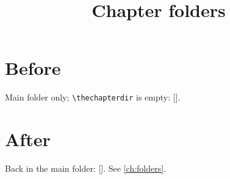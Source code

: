 \documentclass{akizumi-book}
\title{Chapter folders}
\begin{document}
\mainmatter
\chapter{Before}
Main folder only; \verb|\thechapterdir| is empty: [\thechapterdir].

\chapterdir{}
\chapter{After}
Back in the main folder: [\thechapterdir]. See \cref{ch:folders}.
\end{document}
